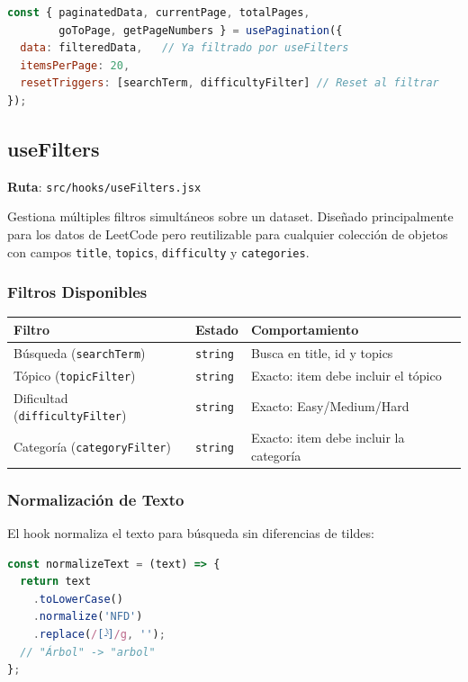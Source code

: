 \documentclass[12pt,a4paper]{article}
\begin{document}
\begin{lstlisting}[language=JavaScript, caption={Uso típico en un componente de tabla}]
const { paginatedData, currentPage, totalPages,
        goToPage, getPageNumbers } = usePagination({
  data: filteredData,   // Ya filtrado por useFilters
  itemsPerPage: 20,
  resetTriggers: [searchTerm, difficultyFilter] // Reset al filtrar
});
\end{lstlisting}

\subsection{useFilters}

\textbf{Ruta}: \texttt{src/hooks/useFilters.jsx}

Gestiona múltiples filtros simultáneos sobre un dataset. Diseñado principalmente para los datos de LeetCode pero reutilizable para cualquier colección de objetos con campos \texttt{title}, \texttt{topics}, \texttt{difficulty} y \texttt{categories}.

\subsubsection{Filtros Disponibles}

\begin{table}[h]
\centering
\begin{tabular}{lll}
\toprule
\textbf{Filtro} & \textbf{Estado} & \textbf{Comportamiento} \\
\midrule
Búsqueda (\texttt{searchTerm}) & \texttt{string} & Busca en title, id y topics \\
Tópico (\texttt{topicFilter}) & \texttt{string} & Exacto: item debe incluir el tópico \\
Dificultad (\texttt{difficultyFilter}) & \texttt{string} & Exacto: Easy/Medium/Hard \\
Categoría (\texttt{categoryFilter}) & \texttt{string} & Exacto: item debe incluir la categoría \\
\bottomrule
\end{tabular}
\end{table}

\subsubsection{Normalización de Texto}

El hook normaliza el texto para búsqueda sin diferencias de tildes:

\begin{lstlisting}[language=JavaScript]
const normalizeText = (text) => {
  return text
    .toLowerCase()
    .normalize('NFD')
    .replace(/[̀-ͯ]/g, '');
  // "Árbol" -> "arbol"
};
\end{lstlisting}
\end{document}
